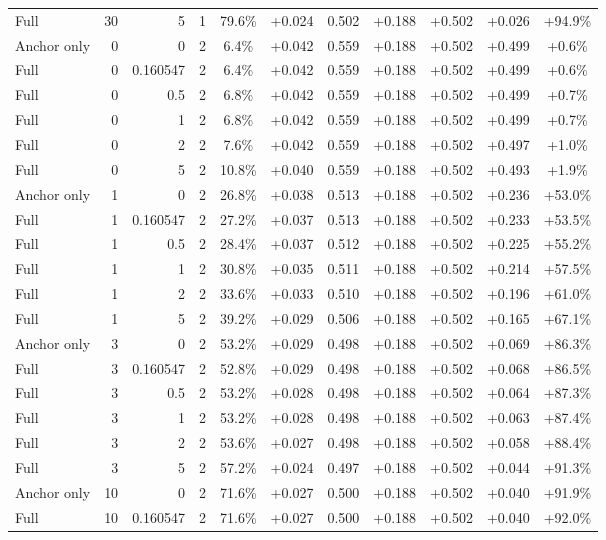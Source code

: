 \begin{table}[htbp]
\begin{tabular}{lrrrccccccc}
Full & 30 & 5 & 1 & 79.6\% & +0.024 & 0.502 & +0.188 & +0.502 & +0.026 & +94.9\% \\
Anchor only & 0 & 0 & 2 & 6.4\% & +0.042 & 0.559 & +0.188 & +0.502 & +0.499 & +0.6\% \\
Full & 0 & 0.160547 & 2 & 6.4\% & +0.042 & 0.559 & +0.188 & +0.502 & +0.499 & +0.6\% \\
Full & 0 & 0.5 & 2 & 6.8\% & +0.042 & 0.559 & +0.188 & +0.502 & +0.499 & +0.7\% \\
Full & 0 & 1 & 2 & 6.8\% & +0.042 & 0.559 & +0.188 & +0.502 & +0.499 & +0.7\% \\
Full & 0 & 2 & 2 & 7.6\% & +0.042 & 0.559 & +0.188 & +0.502 & +0.497 & +1.0\% \\
Full & 0 & 5 & 2 & 10.8\% & +0.040 & 0.559 & +0.188 & +0.502 & +0.493 & +1.9\% \\
Anchor only & 1 & 0 & 2 & 26.8\% & +0.038 & 0.513 & +0.188 & +0.502 & +0.236 & +53.0\% \\
Full & 1 & 0.160547 & 2 & 27.2\% & +0.037 & 0.513 & +0.188 & +0.502 & +0.233 & +53.5\% \\
Full & 1 & 0.5 & 2 & 28.4\% & +0.037 & 0.512 & +0.188 & +0.502 & +0.225 & +55.2\% \\
Full & 1 & 1 & 2 & 30.8\% & +0.035 & 0.511 & +0.188 & +0.502 & +0.214 & +57.5\% \\
Full & 1 & 2 & 2 & 33.6\% & +0.033 & 0.510 & +0.188 & +0.502 & +0.196 & +61.0\% \\
Full & 1 & 5 & 2 & 39.2\% & +0.029 & 0.506 & +0.188 & +0.502 & +0.165 & +67.1\% \\
Anchor only & 3 & 0 & 2 & 53.2\% & +0.029 & 0.498 & +0.188 & +0.502 & +0.069 & +86.3\% \\
Full & 3 & 0.160547 & 2 & 52.8\% & +0.029 & 0.498 & +0.188 & +0.502 & +0.068 & +86.5\% \\
Full & 3 & 0.5 & 2 & 53.2\% & +0.028 & 0.498 & +0.188 & +0.502 & +0.064 & +87.3\% \\
Full & 3 & 1 & 2 & 53.2\% & +0.028 & 0.498 & +0.188 & +0.502 & +0.063 & +87.4\% \\
Full & 3 & 2 & 2 & 53.6\% & +0.027 & 0.498 & +0.188 & +0.502 & +0.058 & +88.4\% \\
Full & 3 & 5 & 2 & 57.2\% & +0.024 & 0.497 & +0.188 & +0.502 & +0.044 & +91.3\% \\
Anchor only & 10 & 0 & 2 & 71.6\% & +0.027 & 0.500 & +0.188 & +0.502 & +0.040 & +91.9\% \\
Full & 10 & 0.160547 & 2 & 71.6\% & +0.027 & 0.500 & +0.188 & +0.502 & +0.040 & +92.0\% \\

\end{tabular}
\end{table}
